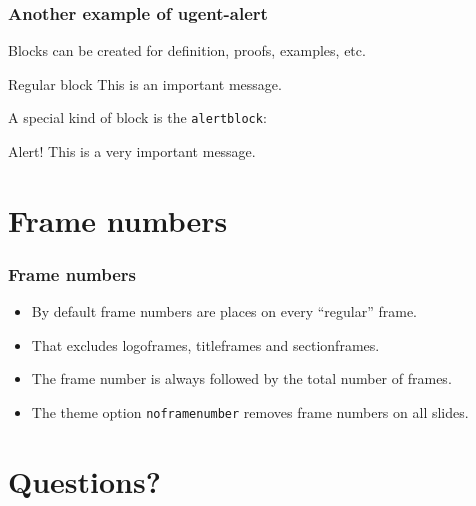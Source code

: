 \documentclass[aspectratio=169]{beamer}
\begin{document}
\begin{frame}
    \frametitle{Another example of ugent-alert}
    Blocks can be created for definition, proofs, examples, etc.
    \begin{block}{Regular block}
        This is an important message.
    \end{block}
    \vspace{.5cm}
    \pause
    A special kind of block is the \texttt{alertblock}:
    \begin{alertblock}{Alert!}
        This is a very important message.
    \end{alertblock}
\end{frame}


\section{Frame numbers}

\begin{frame}
    \frametitle{Frame numbers}
    \begin{itemize}
        \itemsep.25cm
        \item By default frame numbers are places on every ``regular'' frame.
        \item That excludes logoframes, titleframes and sectionframes.
        \item The frame number is always followed by the total number of frames.
        \item The theme option \texttt{noframenumber} removes frame numbers on all slides.
    \end{itemize}
\end{frame}

\section{Questions?}

\titleframe
\end{document}
